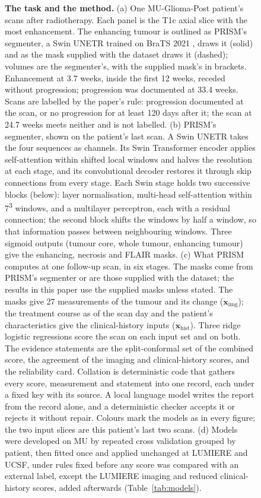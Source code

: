 \begin{figure}[!htbp]
\centering
{}
\caption{\textbf{The task and the method.} (a) One MU-Glioma-Post patient's scans after radiotherapy. Each panel is
the T1c axial slice with the most enhancement. The enhancing tumour is outlined as PRISM's segmenter, a Swin UNETR
trained on BraTS 2021 \citep{hatamizadeh2022}, draws it (solid) and as the mask supplied with the dataset draws it
(dashed); volumes are the segmenter's, with the supplied mask's in brackets. Enhancement at 3.7
weeks, inside the first 12 weeks, receded without progression; progression was documented at 33.4 weeks. Scans are
labelled by the paper's rule: progression documented at the scan, or no progression for at least 120 days after it;
the scan at 24.7 weeks meets neither and is not labelled. (b) PRISM's segmenter, shown on the patient's last scan. A
Swin UNETR \citep{hatamizadeh2022} takes the four sequences as channels. Its Swin Transformer encoder applies
self-attention within shifted local windows and halves the resolution at each stage, and its convolutional decoder
restores it through skip connections from every stage. Each Swin stage holds two successive blocks (below):
layer normalisation, multi-head self-attention within 7\textsuperscript{3} windows, and a multilayer perceptron, each
with a residual connection; the second block shifts the windows by half a window, so that information passes between
neighbouring windows. Three sigmoid outputs (tumour core, whole tumour, enhancing tumour) give the
enhancing, necrosis and FLAIR masks. (c) What PRISM computes at one follow-up scan, in six stages. The masks come from
PRISM's segmenter or are those supplied with the dataset; the results in this paper use the supplied masks unless
stated. The masks
give 27 measurements of the tumour and its change ($\mathbf{x}_{\mathrm{img}}$); the treatment course as of the scan
day and the patient's characteristics give the clinical-history inputs ($\mathbf{x}_{\mathrm{hist}}$). Three ridge
logistic regressions score the scan on each input set and on both. The evidence statements are the split-conformal set of the combined score, the agreement of the imaging and
clinical-history scores, and the reliability card. Collation is deterministic code that gathers every score,
measurement and statement into one record, each under a fixed key with its source. A local language model writes the
report from the record alone, and a deterministic checker accepts it or rejects it without repair. Colours mark the models as in every figure; the two
input slices are this patient's last two scans. (d) Models were developed on MU by repeated cross validation grouped
by patient, then fitted once and applied unchanged at LUMIERE and UCSF, under rules fixed before any score was
compared with an external label, except the LUMIERE imaging and reduced clinical-history scores, added afterwards
(Table~\ref{tab:models}).}
\label{fig:1}
\end{figure}

